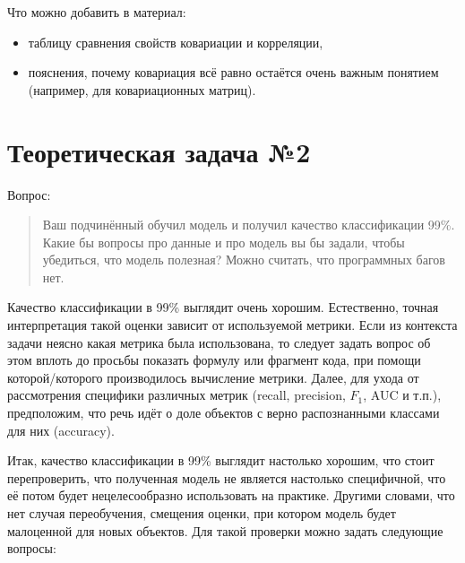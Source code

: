 \documentclass[a4paper,12pt]{article}
\begin{document}
\medskip

{\color{red} \faLightbulbO} Что можно добавить в материал: 

\begin{itemize}
\item таблицу сравнения свойств ковариации и корреляции,
\item пояснения, почему ковариация всё равно остаётся очень важным понятием (например, для ковариационных матриц).
\end{itemize}


\section{Теоретическая задача №2}

Вопрос:

\begin{quote}
Ваш подчинённый обучил модель и получил качество классификации 99\%. Какие бы вопросы про данные и про модель вы бы задали, чтобы убедиться, что модель полезная? Можно считать, что программных багов нет.
\end{quote}

Качество классификации в 99\% выглядит очень хорошим. Естественно, точная интерпретация такой оценки зависит от используемой метрики. Если из контекста задачи неясно какая метрика была использована, то следует задать вопрос об этом вплоть до просьбы показать формулу или фрагмент кода, при помощи которой/которого производилось вычисление метрики. Далее, для ухода от рассмотрения специфики различных метрик (recall, precision, $F_1$, AUC и т.п.), предположим, что речь идёт о доле объектов с верно распознанными классами для них (accuracy).

Итак, качество классификации в 99\% выглядит настолько хорошим, что стоит перепроверить, что полученная модель не является настолько специфичной, что её потом будет нецелесообразно использовать на практике. Другими словами, что нет случая переобучения, смещения оценки, при котором модель будет малоценной для новых объектов. Для такой проверки можно задать следующие вопросы:
\end{document}
